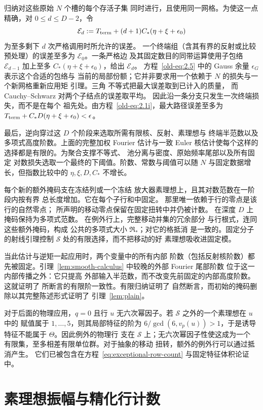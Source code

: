 \documentclass[11pt,a4paper]{article}
\numberwithin{equation}{section}
\numberwithin{figure}{section}
\theoremstyle{definition}
\theoremstyle{remark}
\begin{document}
归纳对这些原始 \(N\) 个槽的每个存活子集
同时进行，且使用同一网格。为使这一点精确，对
\(0\le d\le D-2\)，令
\[
 \mathcal E_d
 :=T_{\rm term}+(d+1)C_*(\eta+\xi+\epsilon_0)
\]
为至多剩下 \(d\) 次严格调用时所允许的误差。
一个终端组（含其有界的反射或比较
预处理）的误差至多为 \(\mathcal E_0\)。一条严格边
及其固定数目的同带运算使用子包络
\(\mathcal E_{d-1}\) 加上至多
\(C_*(\eta+\xi+\epsilon_0)\)，给出 \(\mathcal E_d\)。
方程~\eqref{old-eq:2.5} 中的 Gauss 余量 \(\epsilon_G\) 表示这个合适的包络与
当前的局部份额；它并非要求用一个依赖于 \(N\) 的损失与一个新网格重新应用矩
引理。三角
不等式把最大误差取到已计入的质量，
而 Cauchy--Schwarz 对两个子结点的误差取平均。
因此沿一条分支只发生一次终端损失，而不是在每个
祖先处。由方程~\eqref{old-eq:2.1i}，最大路径误差至多为
\(T_{\rm term}+C_*D(\eta+\xi+\epsilon_0)<\epsilon\)。

最后，逆向穿过这 \(D\) 个阶段来选取所需有限核、反射、素理想与
终端半范数以及多项式高度阶数。上面的完整加权 Fourier 估计与一致
Euler 核估计使每个这样的选择都是有限的。为聚合支撑不等式、
池分离与密度、原始频率尾部以及所有固定
对数损失选取一个最终的下阈值。阶数、常数与阈值可以随
\(N\) 与固定数据增长，但指数比较中的 \(\eta,\xi,D,C_*\)
不增长。

每个新的额外掩码支在冻结列或一个冻结
放大器素理想上，且其对数范数在一阶段内按有界
总长度增加。它在每个子行和中固定。
那里唯一依赖于行的零点是该行的自然零点；
所声明的移动零点保留在固定扭转中并仍被计数。
在深度 \(D\) 上掩码保持为多项式范数。
在例外行上，完整移动并集的冗余部分
与行根式，连同这些额外掩码，构成
公共的多项式大小 \(\mathfrak R_*\)；对它的格抵消
是一致的。固定分子的射线引理控制
\(\mathcal S\) 处的有限选择，而不把移动的好
素理想吸收进固定模。

当此估计与逆矩一起应用时，两个变量中的所有内部
阶数（包括反射核阶数）都先被固定。引理~\ref{lem:smooth-calculus} 中较晚的外部 Fourier 尾部阶数
位于这一内部传播之外：它只提高
外部输入半范数，而不改变先前固定的内部高度阶数。这就证明了
所断言的有限阶一致性。有限归纳证明了
自然断言，而初始的掩码删除以其完整陈述形式证明了
引理~\ref{lem:plain}。

对于后面的物理应用，\(q=0\) 且行 \(u\)
无六次幂因子。若 \(\mathcal S\) 之外的一个素理想在 \(u\) 中的
赋值属于 \(1,\ldots,5\)，则其局部特征的阶为
\(6/\gcd(6,v_p(u))>1\)，于是诱导特征不能属于
\(\Theta\)。因此例外的物理行
支在 \(\mathcal S\) 上；无六次幂因子性使这成为一个
有限集，至多相差有限单位群。对于抽象的移动
扭转，额外的例外行可以通过抵消产生。
它们已被包含在方程~\eqref{eq:exceptional-row-count}
与固定特征体积论证中。
\section{素理想振幅与精化行计数}\label{sec:refined-row-counts}
\end{document}
